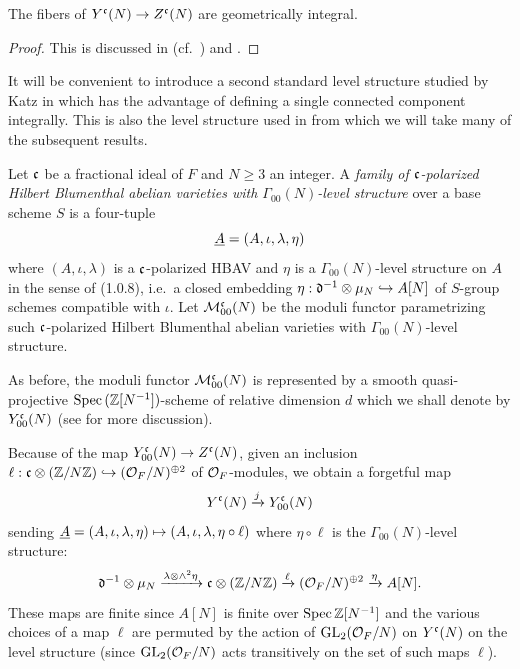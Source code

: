 \documentclass[main.tex]{subfiles}
\begin{document}
\begin{prop} 
The fibers of $Y^{\mathfrak{c}}(N) \to Z^{\mathfrak{c}}(N)$ are geometrically integral.
\end{prop}

\begin{proof}
This is discussed in \cite[\S2.4]{deligne_pappas:singularities} (cf.\  \cite[\S2.2]{diamond:serre_weight}) and \cite[\S2.13]{deligne_pappas:singularities}.
\end{proof}



It will be convenient to introduce a second standard level structure studied by Katz in \cite{katz:p-adic} which has the advantage of defining a single connected component integrally. This is also the level structure used in \cite{goren_deshalit:foliations_shimura} from which we will take many of the subsequent results. 

\begin{defn}
Let $\mathfrak{c}$ be a fractional ideal of $F$ and $N \ge 3$ an integer. A \textit{family of $\mathfrak{c}$-polarized Hilbert Blumenthal abelian varieties with $\Gamma_{00}(N)$-level structure} over a base scheme $S$ is a four-tuple
\[ \underline{A} = (A, \iota, \lambda, \eta) \]
where $(A, \iota, \lambda)$ is a $\mathfrak{c}$-polarized HBAV and $\eta$ is a $\Gamma_{00}(N)$-level structure on $A$ in the sense of \cite{katz:p-adic} (1.0.8), i.e.\ a closed embedding $\eta : \mathfrak{d}^{-1} \otimes \mu_N \hookrightarrow A[N]$ of $S$-group schemes compatible with $\iota$. 
Let $\mathcal{M}^{\mathfrak{c}}_{00}(N)$ be the moduli functor parametrizing such $\mathfrak{c}$-polarized Hilbert Blumenthal abelian varieties with $\Gamma_{00}(N)$-level structure. 
\end{defn}

As before, the moduli functor $\mathcal{M}^{\mathfrak{c}}_{00}(N)$ is represented by a smooth quasi-projective $\operatorname{\mathrm{Spec}}{(\mathbb{Z}[N^{-1}])}$-scheme of relative dimension $d$ which we shall denote by $Y^{\mathfrak{c}}_{00}(N)$ (see \cite{rapoport:compactifications, katz:p-adic} for more discussion). 


Because of the map $Y^{\mathfrak{c}}_{00}(N) \to Z^{\mathfrak{c}}(N)$, given an inclusion $\ell : \mathfrak{c} \otimes (\mathbb{Z}/ N \mathbb{Z}) \hookrightarrow (\mathcal{O}_F/N)^{\oplus 2}$ of $\mathcal{O}_F$-modules, we obtain a forgetful map
\[ Y^{\mathfrak{c}}(N) \xrightarrow{j} Y^{\mathfrak{c}}_{00}(N) \]
sending $\underline{A} = (A, \iota, \lambda, \eta) \mapsto (A, \iota, \lambda, \eta \circ \ell)$ where $\eta \circ \ell$ is the $\Gamma_{00}(N)$-level structure:
\[ \mathfrak{d}^{-1} \otimes \mu_N \xrightarrow{\lambda \otimes \wedge^2 \eta} \mathfrak{c} \otimes (\mathbb{Z} / N \mathbb{Z}) \xrightarrow{\ell} (\mathcal{O}_F / N)^{\oplus 2} \xrightarrow{\eta} A[N]. \]
These maps are finite \etale since $A[N]$ is finite \etale over $\operatorname{\mathrm{Spec}}{\mathbb{Z}[N^{-1}]}$ and the various choices of a map $\ell$ are permuted by the action of $\mathrm{GL}_2(\mathcal{O}_F/N)$ on $Y^{\mathfrak{c}}(N)$ on the level structure (since $\mathrm{GL}_2(\mathcal{O}_F/N)$ acts transitively on the set of such maps $\ell$). 
\end{document}

